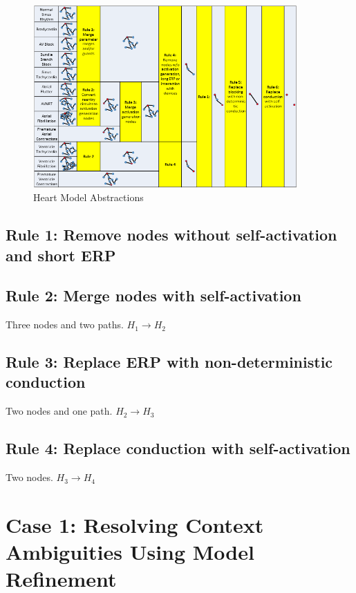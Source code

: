 \documentclass{llncs}
\begin{document}
\begin{figure}[!t]
		\centering
		\includegraphics[width=0.9\textwidth]{figs/rule.png}
		\caption{\small Heart Model Abstractions}
		\label{fig:abs}
\end{figure}

\subsection{}
\subsection{Rule 1: Remove nodes without self-activation and short ERP}


\subsection{Rule 2: Merge nodes with self-activation}
Three nodes and two paths. $H_1\rightarrow H_2$
\subsection{Rule 3: Replace ERP with non-deterministic conduction}
Two nodes and one path. $H_2\rightarrow H_3$
\subsection{Rule 4: Replace conduction with self-activation}
Two nodes. $H_3\rightarrow H_4$

\section{Case 1: Resolving Context Ambiguities Using Model Refinement}
\end{document}

